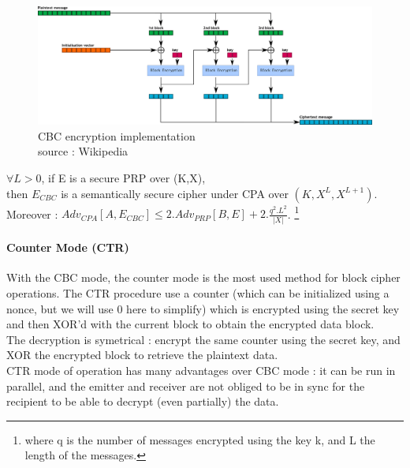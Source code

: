 \begin{figure}[h!]
    \centering
       \includegraphics[width=\textwidth]{images/CBC.png}
	\caption{CBC encryption implementation \\ source : Wikipedia}
	\label{fig:CBC_encryption_impl}
\end{figure}


\begin{mytheorem}
   $\forall L>0$, if E is a secure PRP over (K,X), \\
   then $E_{CBC}$ is a semantically secure cipher under CPA over $(K,X^L,X^{L+1})$. \\
    Moreover : $Adv_{CPA}[A,E_{CBC}] \leq 2.Adv_{PRP}[B,E] + 2.\frac{q^2.L^2}{|X|} $. \footnote{where q is the number of messages encrypted using the key k, and L the length of the messages.}
\end{mytheorem}

\paragraph{ Counter Mode (CTR) }

With the CBC mode, the counter mode is the most used method for block cipher operations. The CTR procedure use a counter (which can be initialized using a nonce, but we will use 0 here to simplify) which is encrypted using the secret key and then XOR'd with the current block to obtain the encrypted data block. \\
The decryption is symetrical : encrypt the same counter using the secret key, and XOR the encrypted block to retrieve the plaintext data. \\
CTR mode of operation has many advantages over CBC mode : it can be run in parallel, and the emitter and receiver are not obliged to be in sync for the recipient to be able to decrypt (even partially) the data.  

